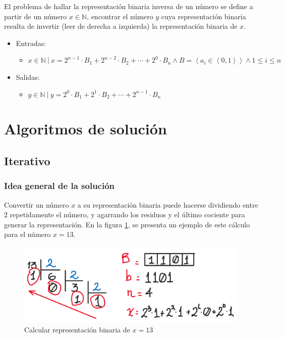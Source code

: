 \documentclass[letter]{article}
\begin{document}
El problema de hallar la representación binaria inversa de un número se define a partir de un número $x \in \mathbb{N}$, encontrar el número $y$ cuya representación binaria resulta de invertir (leer de derecha a izquierda) la representación binaria de $x$. \par

\begin{itemize}
    \item Entradas:
    \begin{itemize}
        \item $x \in \mathbb{N} ~|~ x = 2^{n-1} \cdot B_1 + 2^{n-2} \cdot B_2 + \cdots + 2^{0} \cdot B_n \land B = \left< a_i \in \left< 0, 1 \right> \right> \land 1 \leq i \leq n$
    \end{itemize}
    \item Salidas:
    \begin{itemize}
        \item $y \in \mathbb{N} ~|~ y = 2^{0} \cdot B_1 + 2^{1} \cdot B_2 + \cdots + 2^{n-1} \cdot B_n$
    \end{itemize}
\end{itemize}

\section{Algoritmos de solución} \label{algoritmos}

\subsection{Iterativo} \label{algoritmos:iterativo}

\subsubsection{Idea general de la solución} \label{algoritmos:iterativo:idea}

Convertir un número $x$ a su representación binaria puede hacerse dividiendo entre $2$ repetidamente el número, y agarrando los residuos y el último cociente para generar la representación. En la figura \ref{fig:calcular_rep_bin}, se presenta un ejemplo de este cálculo para el número $x=13$. \par

\begin{figure}[!ht]
    \centering
    \includegraphics[scale=0.3]{img/fig1.png}
    \vspace{-1em}
    \caption{Calcular representación binaria de $x=13$}
    \label{fig:calcular_rep_bin}
\end{figure}
\end{document}
